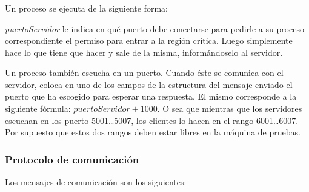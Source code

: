 \subsubsection{}

Un proceso  se ejecuta de la siguiente forma:


\emph{puertoServidor} le indica en qué puerto debe conectarse para pedirle a su
proceso  correspondiente el permiso para entrar a la región
crítica. Luego simplemente hace lo que tiene que hacer y sale de la misma,
informándoselo al servidor.

Un proceso  también escucha en un puerto. Cuando éste se
comunica con el servidor, coloca en uno de los campos de la estructura del
mensaje enviado el puerto que ha escogido para esperar una respuesta. El
mismo corresponde a la siguiente fórmula: $puertoServidor + 1000$. O sea que
mientras que los servidores escuchan en los puerto 5001\ldots5007, los clientes
lo hacen en el rango 6001\ldots6007. Por supuesto que estos dos rangos deben
estar libres en la máquina de pruebas.


\subsubsection{Protocolo de comunicación}

Los mensajes de comunicación son los siguientes:

